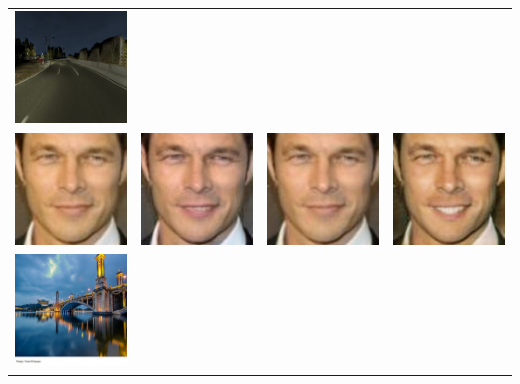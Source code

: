 \documentclass[landscape,a0paper,fontscale=0.285]{baposter} %
\begin{document}
\begin{poster}
{\begin{minipage}{1\linewidth}
\begin{tabular}{cccc}
  \includegraphics[width=.24\textwidth]{figures/dawn2night/001104_fake_B.jpg} \\
      \includegraphics[width=.24\textwidth]{figures/smile/000033_real_A2.jpg}&
  \includegraphics[width=.24\textwidth]{figures/smile/000033_fake_B-1.jpg}&
  \includegraphics[width=.24\textwidth]{figures/UNIT/output.jpg}&
  \includegraphics[width=.24\textwidth]{figures/smile/000033_fake_B.jpg} \\
   \includegraphics[width=.24\textwidth]{figures/vangoh/input.jpg}&

\end{tabular}
\end{minipage}}
\end{poster}
\end{document}
